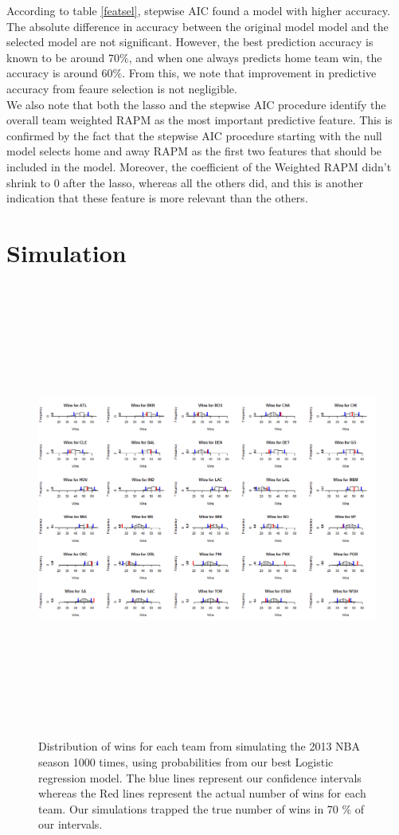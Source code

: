 \documentclass{article} %
\begin{document}
	According to table \ref{featsel}, stepwise AIC found a model with higher accuracy. The absolute difference in accuracy between the original model model and the selected model are not significant. However, the best prediction accuracy is known to be around 70$\%$, and when one always predicts home team win, the accuracy is around 60$\%$. From this, we note that improvement in predictive accuracy from feaure selection is not negligible. \\ 

	We also note that both the lasso and the stepwise AIC procedure identify the overall team weighted RAPM as the most important predictive feature. This is confirmed by the fact that the stepwise AIC procedure starting with the null model selects home and away RAPM as the first two features that should be included in the model. Moreover, the coefficient of the  Weighted RAPM didn't shrink to 0 after the lasso, whereas all the others did, and this is another indication that these feature is more relevant than the others.	

\section{Simulation}	

\begin{figure}
  \centering
  \includegraphics[height=15cm, width=15cm]{season_wins.png}
  \caption{Distribution of wins for each team from simulating the 2013 NBA season 1000 times, using probabilities from our best Logistic regression model. The blue lines represent our confidence intervals whereas the Red lines represent the actual number of wins for each team. Our simulations trapped the true number of wins in 70 \% of our intervals.}
  \label{fig:simulations}
\end{figure}
\end{document}
